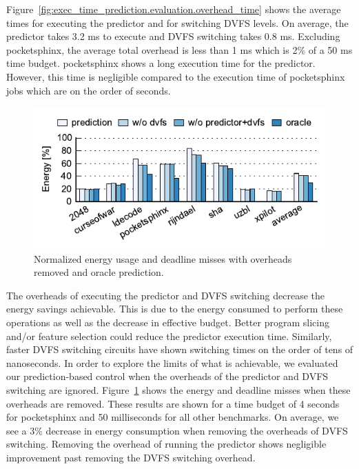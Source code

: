 Figure~\ref{fig:exec_time_prediction.evaluation.overhead_time} shows the
average times for executing the predictor and for switching DVFS levels.  On
average, the predictor takes 3.2 ms to execute and DVFS switching takes 0.8 ms.
Excluding pocketsphinx, the average total overhead is less than 1 ms which is
2\% of a 50 ms time budget.  pocketsphinx shows a long execution time for the
predictor. However, this time is negligible compared to the execution time of
pocketsphinx jobs which are on the order of seconds.

\begin{figure}
  \begin{center}
    \includegraphics{exec_time_prediction/data/overhead_comparison.pdf}
    \caption{Normalized energy usage and deadline misses with overheads removed
    and oracle prediction.}
    \label{fig:exec_time_prediction.evaluation.overhead_comparison}
  \end{center}
\end{figure}

The overheads of executing the predictor and DVFS switching decrease the energy
savings achievable. This is due to the energy consumed to perform these
operations as well as the decrease in effective budget.  Better program slicing
and/or feature selection could reduce the predictor execution time.  Similarly,
faster DVFS switching circuits \cite{booster-hpca12, shortstop-vlsic13,
fgsync-micro14} have shown switching times on the order of tens of nanoseconds.
In order to explore the limits of what is achievable, we evaluated our
prediction-based control when the overheads of the predictor and DVFS switching
are ignored.
Figure~\ref{fig:exec_time_prediction.evaluation.overhead_comparison} shows the
energy and deadline misses when these overheads are removed. These results are
shown for a time budget of 4 seconds for pocketsphinx and 50 milliseconds for all other
benchmarks.  On average, we see a 3\% decrease in energy consumption when
removing the overheads of DVFS switching. Removing the overhead of running the
predictor shows negligible improvement past removing the DVFS switching
overhead.

